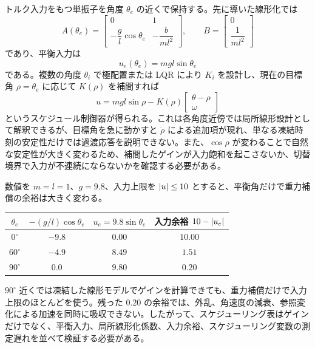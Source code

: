 \begin{example}[振子平衡角による局所ゲインの補間]
トルク入力をもつ単振子を角度 $\theta_e$ の近くで保持する。先に導いた線形化では
\begin{equation}
  A(\theta_e)=
  \begin{bmatrix}
    0&1\\
    -\dfrac{g}{l}\cos\theta_e&-\dfrac{b}{ml^2}
  \end{bmatrix},
  \qquad
  B=
  \begin{bmatrix}
    0\\
    \dfrac{1}{ml^2}
  \end{bmatrix}
\end{equation}
であり、平衡入力は
\begin{equation}
  u_e(\theta_e)=mgl\sin\theta_e
\end{equation}
である。複数の角度 $\theta_i$ で極配置または LQR により $K_i$ を設計し、現在の目標角 $\rho=\theta_e$ に応じて $K(\rho)$ を補間すれば
\begin{equation}
  u=mgl\sin\rho
    -K(\rho)
    \begin{bmatrix}
      \theta-\rho\\
      \omega
    \end{bmatrix}
\end{equation}
というスケジュール制御器が得られる。これは各角度近傍では局所線形設計として解釈できるが、目標角を急に動かすと $\dot{\rho}$ による追加項が現れ、単なる凍結時刻の安定性だけでは過渡応答を説明できない。また、$\cos\rho$ が変わることで自然な安定性が大きく変わるため、補間したゲインが入力飽和を起こさないか、切替境界で入力が不連続にならないかを確認する必要がある。

数値を $m=l=1$、$g=9.8$、入力上限を $\left|u\right|\le10$ とすると、平衡角だけで重力補償の余裕は大きく変わる。
\begin{center}
\begin{tabular}{c|c|c|c}
$\theta_e$ & $-(g/l)\cos\theta_e$ & $u_e=9.8\sin\theta_e$ & 入力余裕 $10-\left|u_e\right|$\\
\hline
$0^\circ$ & $-9.8$ & $0.00$ & $10.00$\\
$60^\circ$ & $-4.9$ & $8.49$ & $1.51$\\
$90^\circ$ & $0.0$ & $9.80$ & $0.20$
\end{tabular}
\end{center}
$90^\circ$ 近くでは凍結した線形モデルでゲインを計算できても、重力補償だけで入力上限のほとんどを使う。残った $0.20$ の余裕では、外乱、角速度の減衰、参照変化による加速を同時に吸収できない。したがって、スケジューリング表はゲインだけでなく、平衡入力、局所線形化係数、入力余裕、スケジューリング変数の測定遅れを並べて検証する必要がある。
\end{example}

